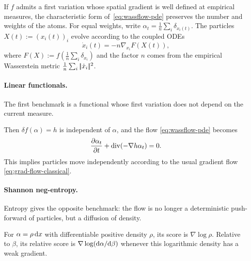 If $f$ admits a first variation whose spatial gradient is well defined at empirical measures, the characteristic form of~\eqref{eq:wassflow-pde} preserves the number and weights of the atoms. For equal weights, write $\alpha_t = \frac{1}{n} \sum_i \delta_{x_i(t)}$. The particles $X(t) := (x_i(t))_i$ evolve according to the coupled ODEs
\begin{equation}
    \dot{x}_i(t) = -n\nabla_{x_i} F(X(t)), \label{eq:wassflows-particles}
\end{equation}
where $F(X) := f\left(\frac{1}{n} \sum_i \delta_{x_i}\right)$ and the factor $n$ comes from the empirical Wasserstein metric $\frac1n\sum_i |\!| \dot x_i |\!|^2$.


\paragraph{Linear functionals.}

The first benchmark is a functional whose first variation does not depend on the current measure.

\begin{example}
   Then $\delta f(\alpha) = h$ is independent of $\alpha$, and the flow \eqref{eq:wassflow-pde} becomes
   \begin{equation*}
       \frac{\partial \alpha_t}{\partial t} + \operatorname{div}(-\nabla h \alpha_t) = 0.
   \end{equation*}
   This implies particles move independently according to the usual gradient flow \eqref{eq:grad-flow-classical}.
\end{example}

\paragraph{Shannon neg-entropy.}


Entropy gives the opposite benchmark: the flow is no longer a deterministic push-forward of particles, but a diffusion of density.

\begin{defn}\label{def-score-function}
For $\alpha=\rho\,\mathrm{d} x$ with differentiable positive density $\rho$, its score is $\nabla\log\rho$. Relative to $\beta$, its relative score is $\nabla\log(\mathrm{d}\alpha/\mathrm{d}\beta)$ whenever this logarithmic density has a weak gradient.
\end{defn}

